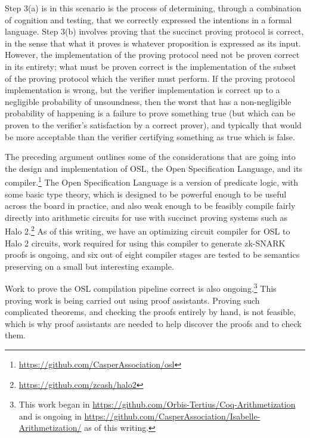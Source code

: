 \documentclass[11pt]{article}
\begin{document}
Step 3(a) is in this scenario is the process of determining,
through a combination of cognition and testing, that we correctly expressed the
intentions in a formal language. Step 3(b) involves proving that the succinct
proving protocol is correct, in the sense that what it proves is whatever proposition
is expressed as its input. However, the implementation of the proving protocol need
not be proven correct in its entirety; what must be proven correct is the implementation
of the subset of the proving protocol which the verifier must perform. If the proving
protocol implementation is wrong, but the verifier implementation is correct up to a
negligible probability of unsoundness, then the worst that has a non-negligible probability
of happening is a failure to prove something true (but which can be proven to the
verifier's satisfaction by a correct prover), and typically that would be more acceptable than
the verifier certifying something as true which is false.

The preceding argument outlines some of the considerations that are going into the
design and implementation of OSL, the Open Specification Language, and its
compiler.\footnote{\url{https://github.com/CasperAssociation/osl}}
The Open Specification Language is a version of predicate logic, with some basic type theory,
which is designed to be powerful enough to be useful across the board in practice, and also weak enough
to be feasibly compile fairly directly into arithmetic circuits
for use with succinct proving systems such as Halo 2.\footnote{\url{https://github.com/zcash/halo2}}
As of this writing, we have an optimizing circuit compiler for OSL to Halo 2 circuits,
work required for using this compiler to generate zk-SNARK proofs is ongoing, and
six out of eight compiler stages are tested to be semantics preserving on a small
but interesting example.

Work to prove the OSL compilation pipeline correct is also ongoing.\footnote{This work began in
\url{https://github.com/Orbis-Tertius/Coq-Arithmetization} and is ongoing in
\url{https://github.com/CasperAssociation/Isabelle-Arithmetization/} as of this writing.}
This proving work is being carried out using proof assistants. Proving such complicated
theorems, and checking the proofs entirely by hand, is not feasible, which is why proof
assistants are needed to help discover the proofs and to check them.
\end{document}
